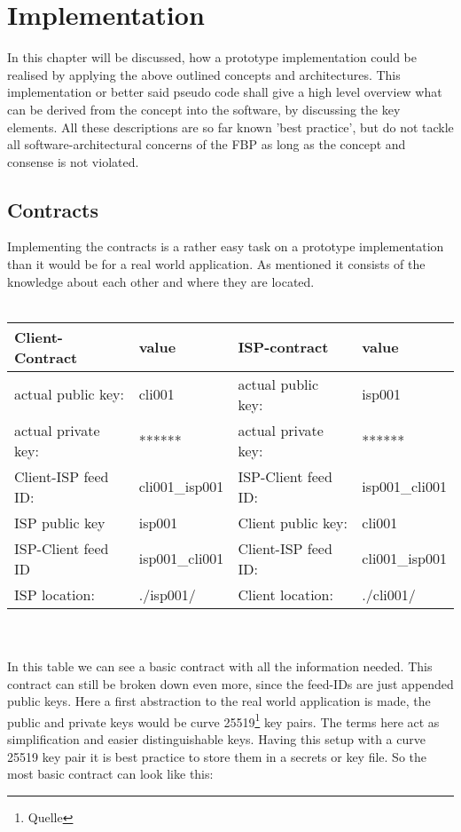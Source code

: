 \chapter{Implementation}
In this chapter will be discussed, how a prototype implementation could be realised by applying the above outlined concepts and architectures. This implementation or better said pseudo code shall give a high level overview what can be derived from the concept into the software, by discussing the key elements. All these descriptions are so far known 'best practice', but do not tackle all software-architectural concerns of the FBP as long as the concept and consense is not violated.
\section{Contracts}
Implementing the contracts is a rather easy task on a prototype implementation than it would be for a real world application. As mentioned it consists of the knowledge about each other and where they are located. 
\\\\
\begin{tabular}{llll} \toprule
    Client-Contract&value&ISP-contract&value\\ \midrule
    actual public key:& cli001 &  actual public key: &isp001  \\ 
    actual private key:& ****** & actual private key:& ****** \\
    Client-ISP feed ID:& cli001\_isp001 &ISP-Client feed ID:&isp001\_cli001 \\ 
    ISP public key&isp001&Client public key:&cli001\\
    ISP-Client feed ID&isp001\_cli001&Client-ISP feed ID:&cli001\_isp001\\
    ISP location:&.\slash isp001\slash &Client location:& .\slash cli001\slash \\\bottomrule
\end{tabular}
\\
\\
In this table we can see a basic contract with all the information needed. This contract can still be broken down even more, since the feed-IDs are just appended public keys. Here a first abstraction to the real world application is made, the public and private keys would be curve 25519\footnote{Quelle} key pairs. The terms here act as simplification and easier distinguishable keys. Having this setup with a curve 25519 key pair it is best practice to store them in a secrets or key file. So the most basic contract can look like this:
